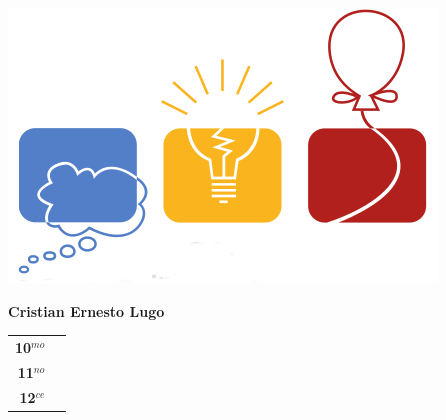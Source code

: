 \begin{minipage}{0.2\textwidth}
	\includegraphics[width=\linewidth]{img/icpc.png} %
\end{minipage}
\hfill
\begin{minipage}{0.7\textwidth}
	\textbf{Cristian Ernesto Lugo}
	
	\vspace*{0.1in}
	\begin{tabular}{rl}
		
		\textbf{10$^{mo}$} &   \\
		
		\textbf{11$^{no}$} &  \\
		
		\textbf{12$^{ce}$} &   \\
		
		
	\end{tabular}
\end{minipage}

